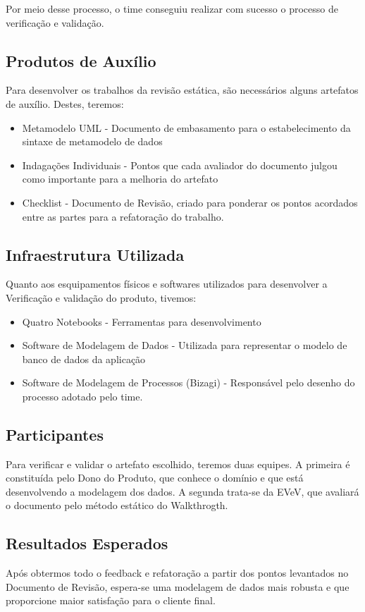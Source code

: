 Por meio desse processo, o time conseguiu realizar com sucesso o processo de verificação e validação.	


\subsection{Produtos de Auxílio}
Para desenvolver os trabalhos da revisão estática, são necessários alguns artefatos
de auxílio. Destes, teremos:

\begin{itemize}
\item Metamodelo UML - Documento de embasamento para o estabelecimento da sintaxe
de metamodelo de dados
\item Indagações Individuais - Pontos que cada avaliador do documento julgou como
importante para a melhoria do artefato
\item Checklist - Documento de Revisão, criado para ponderar os pontos acordados
entre as partes para a refatoração do trabalho.
\end{itemize}

\subsection{Infraestrutura Utilizada}
Quanto aos esquipamentos físicos e softwares utilizados para desenvolver a Verificação
e validação do produto, tivemos:

\begin{itemize}
  \item Quatro Notebooks - Ferramentas para desenvolvimento
  \item Software de Modelagem de Dados - Utilizada para representar o modelo de
  banco de dados da aplicação
  \item Software de Modelagem de Processos (Bizagi) - Responsável pelo desenho do
  processo adotado pelo time.
\end{itemize}

\subsection{Participantes}
Para verificar e validar o artefato escolhido, teremos duas equipes. A primeira é
constituída pelo Dono do Produto, que conhece o domínio e que está desenvolvendo
a modelagem dos dados. A segunda trata-se da EVeV, que avaliará o documento
pelo método estático do Walkthrogth.

\subsection{Resultados Esperados}
Após obtermos todo o feedback e refatoração a partir dos pontos levantados no
Documento de Revisão, espera-se uma modelagem de dados mais robusta e que proporcione
maior satisfação para o cliente final.
